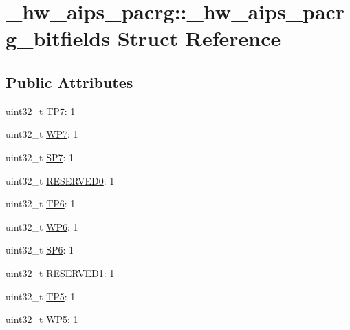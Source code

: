 \hypertarget{struct__hw__aips__pacrg_1_1__hw__aips__pacrg__bitfields}{}\section{\+\_\+hw\+\_\+aips\+\_\+pacrg\+:\+:\+\_\+hw\+\_\+aips\+\_\+pacrg\+\_\+bitfields Struct Reference}
\label{struct__hw__aips__pacrg_1_1__hw__aips__pacrg__bitfields}
\subsection*{Public Attributes}
\begin{DoxyCompactItemize}
\item 
uint32\+\_\+t \hyperlink{struct__hw__aips__pacrg_1_1__hw__aips__pacrg__bitfields_a0fcefa0a0a25d14f9eee38cadc12fdfc}{T\+P7}\+: 1
\item 
uint32\+\_\+t \hyperlink{struct__hw__aips__pacrg_1_1__hw__aips__pacrg__bitfields_aa2005fd965a7b5c4d25737e1392c814c}{W\+P7}\+: 1
\item 
uint32\+\_\+t \hyperlink{struct__hw__aips__pacrg_1_1__hw__aips__pacrg__bitfields_aff4fff359e8060ae231df1deb63b0d31}{S\+P7}\+: 1
\item 
uint32\+\_\+t \hyperlink{struct__hw__aips__pacrg_1_1__hw__aips__pacrg__bitfields_abbd851229f92b400091f0e1df258aa66}{R\+E\+S\+E\+R\+V\+E\+D0}\+: 1
\item 
uint32\+\_\+t \hyperlink{struct__hw__aips__pacrg_1_1__hw__aips__pacrg__bitfields_a160c4e1f164f4bbd63070736747c5626}{T\+P6}\+: 1
\item 
uint32\+\_\+t \hyperlink{struct__hw__aips__pacrg_1_1__hw__aips__pacrg__bitfields_a36d3927144e519a395995a70dad40d86}{W\+P6}\+: 1
\item 
uint32\+\_\+t \hyperlink{struct__hw__aips__pacrg_1_1__hw__aips__pacrg__bitfields_a8738c1503a9e41e27315432e0bd9a65f}{S\+P6}\+: 1
\item 
uint32\+\_\+t \hyperlink{struct__hw__aips__pacrg_1_1__hw__aips__pacrg__bitfields_adef76d611d55c4e18d0bbe8e545c914d}{R\+E\+S\+E\+R\+V\+E\+D1}\+: 1
\item 
uint32\+\_\+t \hyperlink{struct__hw__aips__pacrg_1_1__hw__aips__pacrg__bitfields_a6c3a2bb88651b3b66a06f759fc79336c}{T\+P5}\+: 1
\item 
uint32\+\_\+t \hyperlink{struct__hw__aips__pacrg_1_1__hw__aips__pacrg__bitfields_abd9555b3dad940dcfb19658af45c986a}{W\+P5}\+: 1

\end{DoxyCompactItemize}
